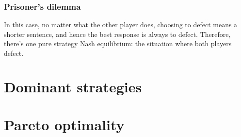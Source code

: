 \documentclass[12pt, a4paper]{article}
\begin{document}
\subsubsection{Prisoner's dilemma}
In this case, no matter what the other player does, choosing to defect means a shorter sentence, and hence the best response is always to defect. Therefore, there's one pure strategy Nash equilibrium: the situation where both players defect.

\section{Dominant strategies}

\section{Pareto optimality}
\end{document}
